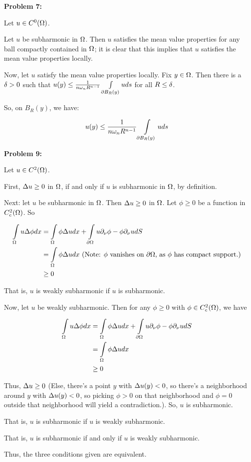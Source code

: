 \documentclass[a4paper,12pt]{article}
\begin{document}
{\bf Problem 7:}

Let $u \in C^0(\Omega)$.

Let $u$ be subharmonic in $\Omega$. Then $u$ satisfies the mean value properties for any ball compactly contained in $\Omega$; it is clear that this implies that $u$ satisfies the mean value properties locally.

Now, let $u$ satisfy the mean value properties locally. Fix $y \in \Omega$. Then there is a $\delta >0$ such that $u(y) \leq \frac{1}{n\omega_nR^{n-1}} \int\limits_{\partial B_{R}(y)} u ds$ for all $R \leq \delta$. 

So, on $B_R(y)$, we have:

\begin{align*}
u(y) &\leq \frac{1}{n\omega_nR^{n-1}} \int\limits_{\partial B_{R}(y)} u ds\\
\end{align*} %

\shunt

{\bf Problem 9:}

Let $u \in C^2(\Omega)$.

First, $\Delta u \geq 0$ in $\Omega$, if and only if $u$ is subharmonic in $\Omega$, by definition. 

Next: let $u$ be subharmonic in $\Omega$. Then $\Delta u \geq 0$ in $\Omega$. Let $\phi \geq 0$ be a function in $C^2_c(\Omega)$. So 

\begin{align*}
\int\limits_{\Omega} u \Delta \phi dx &= \int\limits_{\Omega} \phi \Delta u dx + \int\limits_{\partial \Omega} u \partial_{\nu} \phi - \phi \partial_{\nu} u dS \\
&= \int\limits_{\Omega} \phi \Delta u dx \text{ (Note: $\phi$ vanishes on $\partial \Omega$, as $\phi$ has compact support.)} \\
&\geq 0 \\
\end{align*}

That is, $u$ is weakly subharmonic if $u$ is subharmonic.

Now, let $u$ be weakly subharmonic. Then for any $\phi \geq 0$ with $\phi \in C^2_c(\Omega)$, we have

\begin{align*}
\int\limits_{\Omega} u \Delta \phi dx &= \int\limits_{\Omega} \phi \Delta u dx + \int\limits_{\partial \Omega} u \partial_{\nu} \phi - \phi \partial_{\nu} u dS \\
&= \int\limits_{\Omega} \phi \Delta u dx \\
&\geq 0
\end{align*}

Thus, $\Delta u \geq 0$ (Else, there's a point $y$ with $\Delta u(y) < 0$, so there's a neighborhood around $y$ with $\Delta u(y) < 0$, so picking $\phi >0$ on that neighborhood and $\phi = 0$ outside that neighborhood will yield a contradiction.). So, $u$ is subharmonic.

That is, $u$ is subharmonic if $u$ is weakly subharmonic.

That is, $u$ is subharmonic if and only if $u$ is weakly subharmonic.

Thus, the three conditions given are equivalent.

\shunt
\end{document}
